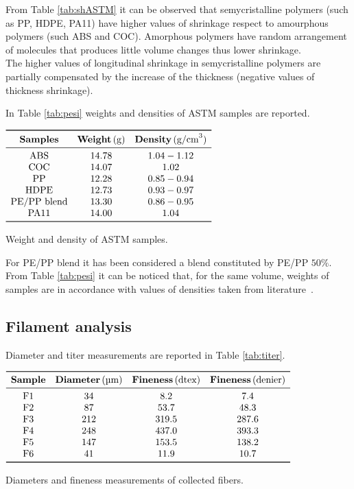 \documentclass[a4paper, 11pt]{article}
\begin{document}
From Table \ref{tab:shASTM} it can be observed that semycristalline polymers (such as PP, HDPE, PA11) have higher values of shrinkage respect to amourphous polymers (such ABS and COC). Amorphous polymers have random arrangement of molecules that produces little volume changes thus lower shrinkage. \\
The higher values of longitudinal shrinkage in semycristalline polymers are partially compensated by the increase of the thickness (negative values of thickness shrinkage).

In Table \ref{tab:pesi} weights and densities of ASTM samples are reported.

\begin{table}[htp]
\centering
$
\begin{array}{ccc}
\toprule
\textbf{Samples} & \textbf{Weight}\,(\text{g}) & \textbf{Density}\,(\text{g/cm}^3) \\
\midrule
\text{ABS} & 14.78 & 1.04-1.12  \\
\text{COC} & 14.07 & 1.02 \\
\text{PP} & 12.28 & 0.85-0.94 \\
\text{HDPE} & 12.73 & 0.93-0.97 \\
\text{PE/PP blend} & 13.30 & 0.86-0.95 \\
\text{PA11} & 14.00 & 1.04 \\
\bottomrule
\end{array}
$
\caption{Weight and density of ASTM samples.}
\label{tab:pesi}
\end{table}

For PE/PP blend it has been considered a blend constituted by PE/PP $50\%$. From Table \ref{tab:pesi} it can be noticed that, for the same volume, weights of samples are in accordance with values of densities taken from literature~\cite{handbook}. 

\newpage

\subsection{Filament analysis}

Diameter and titer measurements are reported in Table \ref{tab:titer}.
\begin{table}[htp]
\centering
$
\begin{array}{cccc}
\toprule
\textbf{Sample} & \textbf{Diameter} \, (\text{µm}) & \textbf{Fineness}\, (\text{dtex}) & \textbf{Fineness} \, (\text{denier}) \\
\midrule
\text{F1} & 34 & 8.2 & 7.4 \\
\text{F2} & 87 & 53.7 & 48.3 \\ 
\text{F3} & 212 & 319.5 & 287.6 \\
\text{F4} & 248 & 437.0 & 393.3 \\
\text{F5} & 147 & 153.5 & 138.2 \\
\text{F6} & 41 & 11.9 & 10.7 \\
\bottomrule
\end{array}
$
\caption{Diameters and fineness measurements of collected fibers.}
\label{tab:titer}
\end{table}
\end{document}
